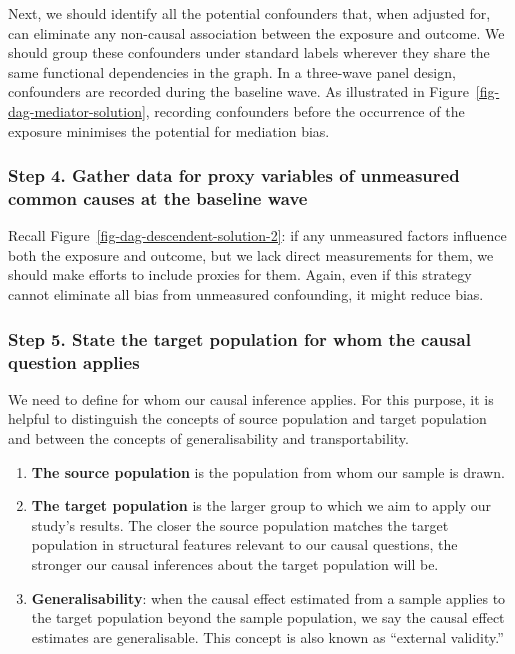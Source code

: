 \documentclass[
  singlecolumn]{article}
\begin{document}
Next, we should identify all the potential confounders that, when
adjusted for, can eliminate any non-causal association between the
exposure and outcome. We should group these confounders under standard
labels wherever they share the same functional dependencies in the
graph. In a three-wave panel design, confounders are recorded during the
baseline wave. As illustrated in Figure~\ref{fig-dag-mediator-solution},
recording confounders before the occurrence of the exposure minimises
the potential for mediation bias.

\hypertarget{step-4.-gather-data-for-proxy-variables-of-unmeasured-common-causes-at-the-baseline-wave}{%
\subsubsection{Step 4. Gather data for proxy variables of unmeasured
common causes at the baseline
wave}\label{step-4.-gather-data-for-proxy-variables-of-unmeasured-common-causes-at-the-baseline-wave}}

Recall Figure~\ref{fig-dag-descendent-solution-2}: if any unmeasured
factors influence both the exposure and outcome, but we lack direct
measurements for them, we should make efforts to include proxies for
them. Again, even if this strategy cannot eliminate all bias from
unmeasured confounding, it might reduce bias.

\hypertarget{step-5.-state-the-target-population-for-whom-the-causal-question-applies}{%
\subsubsection{Step 5. State the target population for whom the causal
question
applies}\label{step-5.-state-the-target-population-for-whom-the-causal-question-applies}}

We need to define for whom our causal inference applies. For this
purpose, it is helpful to distinguish the concepts of source population
and target population and between the concepts of generalisability and
transportability.

\begin{enumerate}
\def\labelenumi{\arabic{enumi}.}
\item
  \textbf{The source population} is the population from whom our sample
  is drawn.
\item
  \textbf{The target population} is the larger group to which we aim to
  apply our study's results. The closer the source population matches
  the target population in structural features relevant to our causal
  questions, the stronger our causal inferences about the target
  population will be.
\item
  \textbf{Generalisability}: when the causal effect estimated from a
  sample applies to the target population beyond the sample population,
  we say the causal effect estimates are generalisable. This concept is
  also known as ``external validity.''
\end{enumerate}
\end{document}
